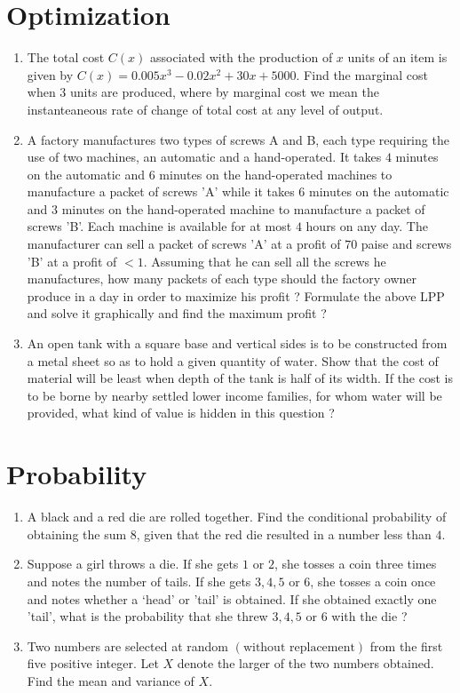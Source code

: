 \documentclass{article}
\providecommand{\brak}[1]{\ensuremath{\left(#1\right)}}
\begin{document}
\section{Optimization}
\begin{enumerate}
\item The total cost $C\brak{x}$ associated with the production of $x$ units of an item is given by $C\brak{x} = 0.005x^{3} - 0.02x^{2} + 30x + 5000$. Find the marginal cost when 3 units are produced, where by marginal cost we mean the instanteaneous rate of change of total cost at any level of output.
\item A factory manufactures two types of screws A and B, each type requiring the use of two machines, an automatic and a hand-operated. It takes $4$ minutes on the automatic and $6$ minutes on the hand-operated machines to manufacture a packet of screws 'A' while it takes $6$ minutes on the automatic and $3$ minutes on the hand-operated machine to manufacture a packet of screws 'B'. Each machine is available for at most $4$ hours on any day. The manufacturer can sell a packet of screws 'A' at a profit of $70$ paise and screws 'B' at a profit of $< 1$. Assuming that he can sell all the screws he manufactures, how many packets of each type should the factory owner produce in a day in order to maximize his profit ? Formulate the above LPP and solve it graphically and find the maximum profit ?
\item An open tank with a square base and vertical sides is to be constructed from a metal sheet so as to hold a given quantity of water. Show that the cost of material will be least when depth of the tank is half of its width. If the cost is to be borne by nearby settled lower income families, for whom water will be provided, what kind of value is hidden in this question ?  	
\end{enumerate}
\section{Probability}
\begin{enumerate}
\item A black and a red die are rolled together. Find the conditional probability of obtaining the sum $8$, given that the red die resulted in a number less than $4$.
\item Suppose a girl throws a die. If she gets $1$ or $2$, she tosses a coin three times and notes the number of tails. If she gets $3, 4, 5$ or $6$, she tosses a coin once and notes whether a ‘head’ or 'tail' is obtained. If she obtained exactly one 'tail', what is the probability that she threw $3, 4, 5$ or $6$ with the die ?
\item Two numbers are selected at random \brak{\text{without replacement}} from the first five positive integer. Let $X$ denote the larger of the two numbers obtained. Find the mean and variance of $X$.
\end{enumerate}
\end{document}
